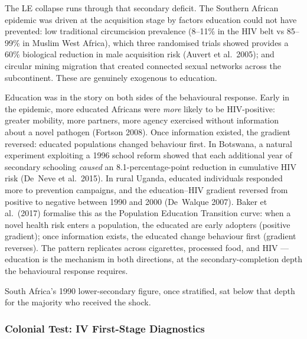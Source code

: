 \documentclass[12pt,letterpaper]{article}
\begin{document}
{The LE collapse runs through that secondary deficit. The Southern
African epidemic was driven at the acquisition stage by factors
education could not have prevented: low traditional circumcision
prevalence (8--11\% in the HIV belt vs 85--99\% in Muslim West
Africa), which three randomised trials showed provides a 60\%
biological reduction in male acquisition risk (Auvert et al.~2005);
and circular mining migration that created connected sexual networks
across the subcontinent. These are genuinely exogenous to education.

Education was in the story on both sides of the behavioural response.
Early in the epidemic, more educated Africans were \emph{more} likely
to be HIV-positive: greater mobility, more partners, more agency
exercised without information about a novel pathogen (Fortson 2008).
Once information existed, the gradient reversed: educated populations
changed behaviour first. In Botswana, a natural experiment exploiting
a 1996 school reform showed that each additional year of secondary
schooling \emph{caused} an 8.1-percentage-point reduction in
cumulative HIV risk (De~Neve et al.~2015). In rural Uganda, educated
individuals responded more to prevention campaigns, and the
education--HIV gradient reversed from positive to negative between
1990 and 2000 (De~Walque 2007). Baker et al.\ (2017) formalise this
as the Population Education Transition curve: when a novel health risk
enters a population, the educated are early adopters (positive
gradient); once information exists, the educated change behaviour
first (gradient reverses). The pattern replicates across cigarettes,
processed food, and HIV --- education is the mechanism in both
directions, at the secondary-completion depth the behavioural response
requires.

South Africa's 1990 lower-secondary figure, once stratified, sat
below that depth for the majority who received the shock.

\subsubsection{Colonial Test: IV First-Stage Diagnostics}\label{appendix-colonial-iv}

}
\end{document}
